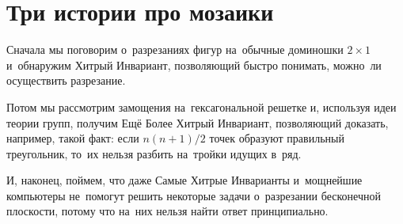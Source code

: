 
\section*{Три истории про мозаики}



Сначала мы поговорим о~разрезаниях фигур на~обычные доминошки $2 \times 1$
и~обнаружим Хитрый Инвариант, позволяющий быстро понимать, можно~ли осуществить
разрезание.

Потом мы рассмотрим замощения на~гексагональной решетке и, используя идеи
теории групп, получим Ещё Более Хитрый Инвариант, позволяющий доказать,
например, такой факт: если $n (n + 1) / 2$ точек образуют правильный
треугольник, то~их нельзя разбить на~тройки идущих в~ряд.

И, наконец, поймем, что даже Самые Хитрые Инварианты и~мощнейшие компьютеры
не~помогут решить некоторые задачи о~разрезании бесконечной плоскости, потому
что на~них нельзя найти ответ принципиально.

